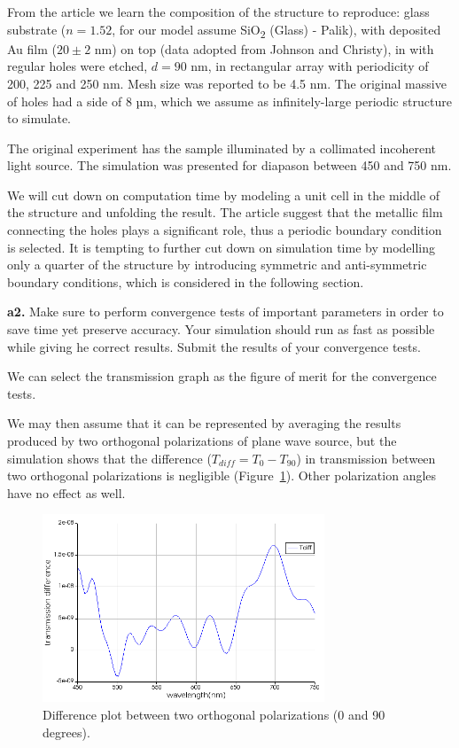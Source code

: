 \documentclass[11pt,a4paper]{article}
\begin{document}
From the article we learn the composition of the structure to reproduce: glass substrate ($n=1.52$, for our model assume SiO\textsubscript{2} (Glass) - Palik), with deposited Au film ($20 \pm 2$ nm) on top (data adopted from Johnson and Christy), in with regular holes were etched, $d=90$ nm, in rectangular array with periodicity of 200, 225 and 250 nm. Mesh size was reported to be 4.5 nm.    
The original massive of holes had a side of 8 µm, which we assume as infinitely-large periodic structure to simulate. 

The original experiment has the sample illuminated by a collimated incoherent light source. The simulation was presented for diapason between 450 and 750 nm. 

We will cut down on computation time by modeling a unit cell in the middle of the structure and unfolding the result. The article suggest that the metallic film connecting the holes plays a significant role, thus a periodic boundary condition is selected. It is tempting to further cut down on simulation time by modelling only a quarter of the structure by introducing symmetric and anti-symmetric boundary conditions, which is considered in the following section. 


\begin{displayquote}
    \textbf{a2.} Make sure to perform convergence tests of important parameters in order to save time yet preserve accuracy. Your simulation should run as fast as possible while giving he correct results. Submit the results of your convergence tests.
\end{displayquote}
We can select the transmission graph as the figure of merit for the convergence tests.

We may then assume that it can be represented by averaging the results produced by two orthogonal polarizations of plane wave source, but the simulation shows that the difference ($T_{diff}=T_{0}-T_{90}$) in transmission between two orthogonal polarizations is negligible (Figure~\ref{fig:diff}). Other polarization angles have no effect as well. 

\begin{figure}
    \centering
    \includegraphics[width=0.75\textwidth]{T_diff_two_polar-s-0-90.png}
    \caption{Difference plot between two orthogonal polarizations (0 and 90 degrees).}
    \label{fig:diff}
\end{figure}
\end{document}
